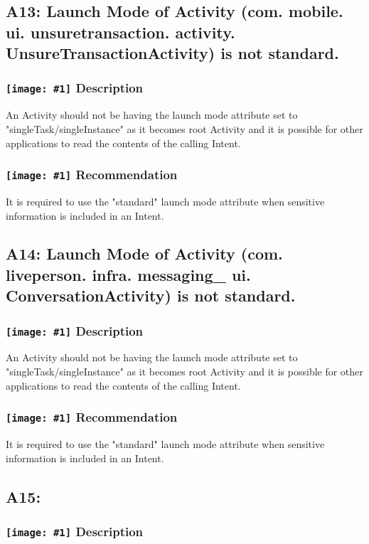 \documentclass[12p]{article}
\newcommand{\icon}[1]{\texttt{[image: \#1]}}
\begin{document}
\subsection{A13: Launch Mode of Activity (com. mobile. ui. unsuretransaction. activity. UnsureTransactionActivity) is not standard.}
\subsubsection*{\protect\icon{/home/miki/Documents/GITHUB/AndroidPermissions/python/vulns/report_icons/basic_sheet.png} Description}
An Activity should not be having the launch mode attribute set to "singleTask/singleInstance" as it becomes root Activity and it is possible for other applications to read the contents of the calling Intent.
\subsubsection*{\protect\icon{/home/miki/Documents/GITHUB/AndroidPermissions/python/vulns/report_icons/basic_todo.png} Recommendation}
It is required to use the "standard" launch mode attribute when sensitive information is included in an Intent.
\subsection{A14: Launch Mode of Activity (com. liveperson. infra. messaging\_ ui. ConversationActivity) is not standard.}
\subsubsection*{\protect\icon{/home/miki/Documents/GITHUB/AndroidPermissions/python/vulns/report_icons/basic_sheet.png} Description}
An Activity should not be having the launch mode attribute set to "singleTask/singleInstance" as it becomes root Activity and it is possible for other applications to read the contents of the calling Intent.
\subsubsection*{\protect\icon{/home/miki/Documents/GITHUB/AndroidPermissions/python/vulns/report_icons/basic_todo.png} Recommendation}
It is required to use the "standard" launch mode attribute when sensitive information is included in an Intent.
\subsection{A15: }
\subsubsection*{\protect\icon{/home/miki/Documents/GITHUB/AndroidPermissions/python/vulns/report_icons/basic_sheet.png} Description}
\end{document}
